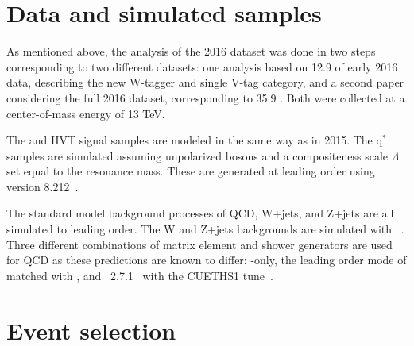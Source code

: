 \section{Data and simulated samples}
\label{sec:searchII:samples}
As mentioned above, the analysis of the 2016 dataset was done in two steps corresponding to two different datasets: one analysis based on 12.9 \fbinv of early 2016 data, describing the new W-tagger and single V-tag category, and a second paper considering the full 2016 dataset, corresponding to 35.9 \fbinv. Both were collected at a center-of-mass energy of 13 TeV.\par
The \BulkG and HVT signal samples are modeled in the same way as in 2015. The $\textrm{q}^*$ samples are simulated assuming unpolarized bosons and a compositeness scale $\Lambda$ set equal to the resonance mass. These are generated at leading order using \PYTHIA version 8.212~\cite{Sjostrand:2007gs}. \par
The standard model background processes of QCD, W+jets, and Z+jets are all simulated to leading order. The W and Z+jets backgrounds are simulated with \amcatnlo~\cite{Alwall:2014hca,Alwall:2007fs}. Three different combinations of matrix element and shower generators are used for QCD as these predictions are known to differ: \PYTHIA-only, the leading order mode of \amcatnlo{} matched with \PYTHIA, and \HERWIG{++}~2.7.1~\cite{Bahr:2008pv} with the CUETHS1 tune~\cite{Khachatryan:2015pea}.
\clearpage
\section{Event selection}
